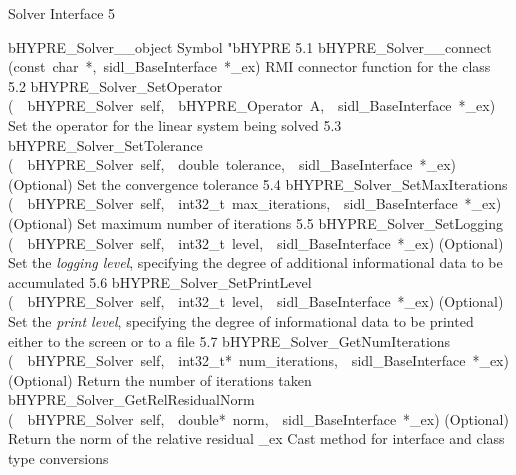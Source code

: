 \documentclass{article}
\begin{document}
\begin{cxxentry}
{}
        {Solver Interface}
        {}
        {
}
        {5}
\begin{cxxnames}
        {bHYPRE\_Solver\_\_object}
        {}
        {
Symbol "bHYPRE}
        {5.1}
        {bHYPRE\_Solver\_\_connect}
        {(const\ char\ *,\ sidl\_BaseInterface\ *\_ex)}
        {
RMI connector function for the class}
        {5.2}
        {bHYPRE\_Solver\_SetOperator}
        {(\ \ bHYPRE\_Solver\ self,\ \ bHYPRE\_Operator\ A,\ \ sidl\_BaseInterface\ *\_ex)}
        {
Set the operator for the linear system being solved}
        {5.3}
        {bHYPRE\_Solver\_SetTolerance}
        {(\ \ bHYPRE\_Solver\ self,\ \ double\ tolerance,\ \ sidl\_BaseInterface\ *\_ex)}
        {
(Optional) Set the convergence tolerance}
        {5.4}
        {bHYPRE\_Solver\_SetMaxIterations}
        {(\ \ bHYPRE\_Solver\ self,\ \ int32\_t\ max\_iterations,\ \ sidl\_BaseInterface\ *\_ex)}
        {
(Optional) Set maximum number of iterations}
        {5.5}
        {bHYPRE\_Solver\_SetLogging}
        {(\ \ bHYPRE\_Solver\ self,\ \ int32\_t\ level,\ \ sidl\_BaseInterface\ *\_ex)}
        {
(Optional) Set the {\it logging level}, specifying the degree
of additional informational data to be accumulated}
        {5.6}
        {bHYPRE\_Solver\_SetPrintLevel}
        {(\ \ bHYPRE\_Solver\ self,\ \ int32\_t\ level,\ \ sidl\_BaseInterface\ *\_ex)}
        {
(Optional) Set the {\it print level}, specifying the degree
of informational data to be printed either to the screen or
to a file}
        {5.7}
        {bHYPRE\_Solver\_GetNumIterations}
        {(\ \ bHYPRE\_Solver\ self,\ \ int32\_t*\ num\_iterations,\ \ sidl\_BaseInterface\ *\_ex)}
        {
(Optional) Return the number of iterations taken}
        {}
\label{cxx.5.11}
        {bHYPRE\_Solver\_GetRelResidualNorm}
        {(\ \ bHYPRE\_Solver\ self,\ \ double*\ norm,\ \ sidl\_BaseInterface\ *\_ex)}
        {
(Optional) Return the norm of the relative residual}
        {}
\label{cxx.5.12}
        {\_ex}
        {}
        {
Cast method for interface and class type conversions}

\end{cxxnames}
\end{cxxentry}
\end{document}
